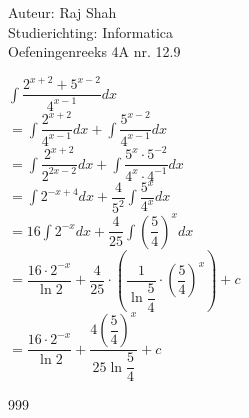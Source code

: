 \documentclass[a4paper]{article}
\begin{document}
  
\noindent \large Auteur: Raj Shah \\
\noindent \large Studierichting: Informatica\\
\noindent \large Oefeningenreeks 4A nr. 12.9 \\

\medskip

\normalsize

$\displaystyle\int \dfrac{2^{x+2} + 5^{x-2}}{4^{x-1}}dx$\\

$ = \displaystyle\int \dfrac{2^{x+2}}{4^{x-1}}dx + \displaystyle\int \dfrac{ 5^{x-2}}{4^{x-1}}dx$\\

$ = \displaystyle\int \dfrac{2^{x+2}}{2^{2x-2}}dx + \displaystyle\int \dfrac{ 5^{x}\cdot 5^{-2}}{4^{x}\cdot 4^{-1}}dx$\\

$ = \displaystyle\int 2^{-x+4} dx +  \dfrac{4}{5^2} \displaystyle\int \dfrac{5^x}{4^x}dx$\\

$ = 16 \displaystyle\int 2^{-x} dx + \dfrac{4}{25} \displaystyle\int \left(\dfrac{5}{4}\right)^x dx$\\

$ = \dfrac{16 \cdot 2^{-x}}{\ln 2} + \dfrac{4}{25} \cdot \left(\dfrac{1}{ \ln \dfrac{5}{4}} \cdot \left(\dfrac{5}{4}\right)^x\right) + c$\\

$ = \dfrac{16 \cdot 2^{-x}}{\ln 2} + \dfrac{4 \left(\dfrac{5}{4}\right)^x}{25 \ln \dfrac{5}{4}} + c$\\
\begin{thebibliography}{999}
\end{thebibliography}
\end{document}
